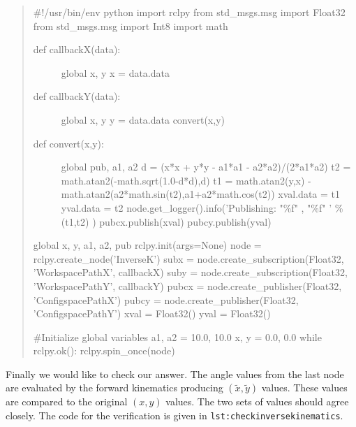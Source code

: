 \begin{quote}
\#!/usr/bin/env python import rclpy from std\_msgs.msg import Float32
from std\_msgs.msg import Int8 import math

\begin{description}
\item[def callbackX(data):]
global x, y x = data.data
\item[def callbackY(data):]
global x, y y = data.data convert(x,y)
\item[def convert(x,y):]
global pub, a1, a2 d = (x*x + y*y - a1*a1 - a2*a2)/(2*a1*a2) t2 =
math.atan2(-math.sqrt(1.0-d*d),d) t1 = math.atan2(y,x) -
math.atan2(a2*math.sin(t2),a1+a2*math.cos(t2)) xval.data = t1 yval.data
= t2 node.get\_logger().info('Publishing: "\%f" , "\%f" ' \% (t1,t2) )
pubcx.publish(xval) pubcy.publish(yval)
\end{description}

global x, y, a1, a2, pub rclpy.init(args=None) node =
rclpy.create\_node('InverseK') subx = node.create\_subscription(Float32,
'WorkspacePathX', callbackX) suby = node.create\_subscription(Float32,
'WorkspacePathY', callbackY) pubcx = node.create\_publisher(Float32,
'ConfigspacePathX') pubcy = node.create\_publisher(Float32,
'ConfigspacePathY') xval = Float32() yval = Float32()

\#Initialize global variables a1, a2 = 10.0, 10.0 x, y = 0.0, 0.0 while
rclpy.ok(): rclpy.spin\_once(node)
\end{quote}

Finally we would like to check our answer. The angle values from the
last node are evaluated by the forward kinematics producing
\((\tilde{x},\tilde{y})\) values. These values are compared to the
original \((x,y)\) values. The two sets of values should agree closely.
The code for the verification is given in
\texttt{lst:checkinversekinematics}.

